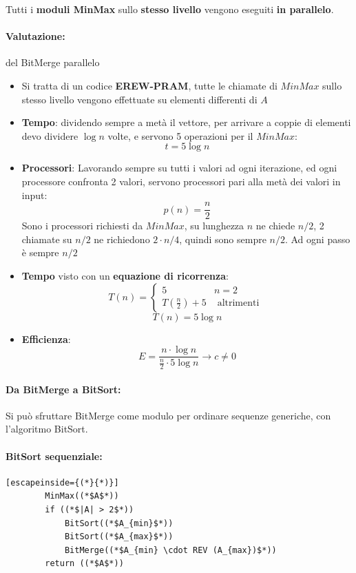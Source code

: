 \documentclass[11pt]{article}
\begin{document}
	Tutti i \textbf{moduli MinMax} sullo \textbf{stesso livello} vengono eseguiti \textbf{in parallelo}.\\
	
	\newpage
	
	\paragraph{Valutazione:} del BitMerge parallelo
	\begin{itemize}
		\item Si tratta di un codice \textbf{EREW-PRAM}, tutte le chiamate di $MinMax$ sullo stesso livello vengono effettuate su elementi differenti di $A$
		
		\item \textbf{Tempo}: dividendo sempre a metà il vettore, per arrivare a coppie di elementi devo dividere $\log n$ volte, e servono 5 operazioni per il $MinMax$:
		$$ t = 5 \log n $$
		
		\item \textbf{Processori}: Lavorando sempre su tutti i valori ad ogni iterazione, ed ogni processore confronta 2 valori, servono processori pari alla metà dei valori in input:
		$$ p(n) = \frac{n}{2} $$
		Sono i processori richiesti da $MinMax$, su lunghezza $n$ ne chiede $n/2$, 2 chiamate su $n/2$ ne richiedono $2 \cdot n/4$, quindi sono sempre $n/2$. Ad ogni passo è sempre $n/2$
		
		\item \textbf{Tempo} visto con un \textbf{equazione di ricorrenza}: 
		$$ T(n) = \begin{cases}
			5 & n = 2 \\
			T(\frac{n}{2}) + 5 & \text{ altrimenti }
		\end{cases}
		$$
		$$ T(n) = 5 \log n $$
		
		\item \textbf{Efficienza}:
		$$ E = \frac{n \cdot \log n}{\frac{n}{2} \cdot 5 \log n} \rightarrow c \neq 0 $$
	\end{itemize} 
	
	\newpage
	
	\paragraph{Da BitMerge a BitSort:} Si può sfruttare BitMerge come modulo per ordinare sequenze generiche, con l'algoritmo BitSort.\\
	
	\paragraph{BitSort sequenziale:} \hfill 
	\begin{lstlisting}[escapeinside={(*}{*)}]
		MinMax((*$A$*))
		if ((*$|A| > 2$*))
			BitSort((*$A_{min}$*))
			BitSort((*$A_{max}$*))
			BitMerge((*$A_{min} \cdot REV (A_{max})$*))
		return ((*$A$*))
	\end{lstlisting}
	
\end{document}
